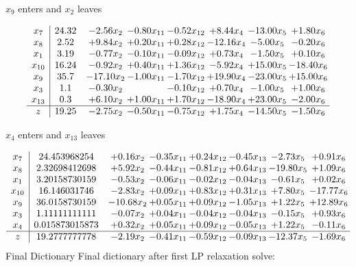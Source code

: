 \documentclass[8pt]{article}
\begin{document}
 $ x_{9} $ enters and $ x_{2} $ leaves 

 \[\begin{array}{c| c c@{\hskip 2pt} c@{\hskip 2pt} c@{\hskip 2pt} c@{\hskip 2pt} c@{\hskip 2pt} c@{\hskip 2pt} }
 x_{7}   &  24.32 & -2.56 x_{2} & -0.80 x_{11} & -0.52 x_{12} & +  8.44 x_{4} & -13.00 x_{5} & +  1.80 x_{6}\\
 x_{8}   &  2.52 & +  9.84 x_{2} & +  0.20 x_{11} & +  0.28 x_{12} & -12.16 x_{4} & -5.00 x_{5} & -0.20 x_{6}\\
 x_{1}   &  3.19 & -0.77 x_{2} & -0.10 x_{11} & -0.09 x_{12} & +  0.73 x_{4} & -1.50 x_{5} & +  0.10 x_{6}\\
 x_{10}   &  16.24 & -0.92 x_{2} & +  0.40 x_{11} & +  1.36 x_{12} & -5.92 x_{4} & + 15.00 x_{5} & -18.40 x_{6}\\
 x_{9}   &  35.7 & -17.10 x_{2} & -1.00 x_{11} & -1.70 x_{12} & + 19.90 x_{4} & -23.00 x_{5} & + 15.00 x_{6}\\
 x_{3}   &  1.1 & -0.30 x_{2} &   & -0.10 x_{12} & +  0.70 x_{4} & -1.00 x_{5} & +  1.00 x_{6}\\
 x_{13}   &  0.3 & +  6.10 x_{2} & +  1.00 x_{11} & +  1.70 x_{12} & -18.90 x_{4} & + 23.00 x_{5} & -2.00 x_{6}\\
\hline
z    &  19.25 & -2.75 x_{2} & -0.50 x_{11} & -0.75 x_{12} & +  1.75 x_{4} & -14.50 x_{5} & -1.50 x_{6}\\
\end{array}\]


 $ x_{4} $ enters and $ x_{13} $ leaves 

 \[\begin{array}{c| c c@{\hskip 2pt} c@{\hskip 2pt} c@{\hskip 2pt} c@{\hskip 2pt} c@{\hskip 2pt} c@{\hskip 2pt} }
 x_{7}   &  24.453968254 & +  0.16 x_{2} & -0.35 x_{11} & +  0.24 x_{12} & -0.45 x_{13} & -2.73 x_{5} & +  0.91 x_{6}\\
 x_{8}   &  2.32698412698 & +  5.92 x_{2} & -0.44 x_{11} & -0.81 x_{12} & +  0.64 x_{13} & -19.80 x_{5} & +  1.09 x_{6}\\
 x_{1}   &  3.20158730159 & -0.53 x_{2} & -0.06 x_{11} & -0.02 x_{12} & -0.04 x_{13} & -0.61 x_{5} & +  0.02 x_{6}\\
 x_{10}   &  16.146031746 & -2.83 x_{2} & +  0.09 x_{11} & +  0.83 x_{12} & +  0.31 x_{13} & +  7.80 x_{5} & -17.77 x_{6}\\
 x_{9}   &  36.0158730159 & -10.68 x_{2} & +  0.05 x_{11} & +  0.09 x_{12} & -1.05 x_{13} & +  1.22 x_{5} & + 12.89 x_{6}\\
 x_{3}   &  1.11111111111 & -0.07 x_{2} & +  0.04 x_{11} & -0.04 x_{12} & -0.04 x_{13} & -0.15 x_{5} & +  0.93 x_{6}\\
 x_{4}   &  0.015873015873 & +  0.32 x_{2} & +  0.05 x_{11} & +  0.09 x_{12} & -0.05 x_{13} & +  1.22 x_{5} & -0.11 x_{6}\\
\hline
z    &  19.2777777778 & -2.19 x_{2} & -0.41 x_{11} & -0.59 x_{12} & -0.09 x_{13} & -12.37 x_{5} & -1.69 x_{6}\\
\end{array}\]
Final Dictionary
Final dictionary after first LP relaxation solve: 
\end{document}
